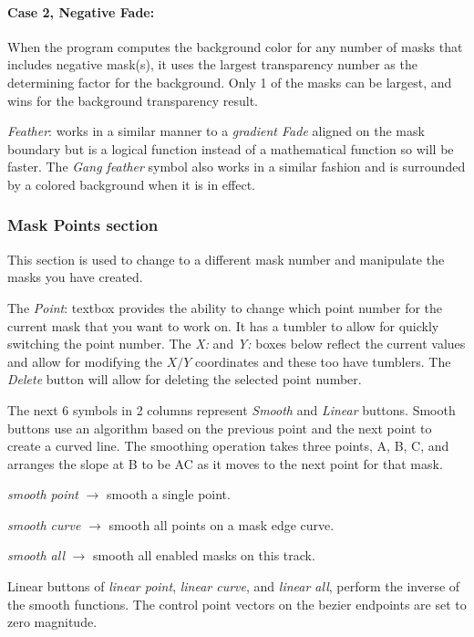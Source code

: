 \paragraph{Case 2, Negative Fade:} When the program computes the background color for any number of masks that includes negative
mask(s), it uses the largest transparency number as the determining factor for the background. Only 1 of the masks can be largest, and wins for the background transparency result.

\vspace{3ex}\textit{Feather}: works in a similar manner to a \textit{gradient Fade} aligned on the mask boundary but is a logical function instead of a mathematical function so will be faster.  The \textit{Gang feather} symbol also works in a similar fashion and is surrounded by a colored background when it is in effect.

\subsubsection*{Mask Points section}%
\label{ssub:masks_points_section}

This section is used to change to a different mask number and manipulate the masks you have created.

The \textit{Point}: textbox provides the ability to change which point number for the current mask that you want to work on.  It has a tumbler to allow for quickly switching the point number.  The \textit{X:} and \textit{Y:} boxes below reflect the current values and allow for modifying the $X/Y$ coordinates and these too have tumblers. The \textit{Delete} button will allow for deleting the selected point number.

The next 6 symbols in 2 columns represent \textit{Smooth} and \textit{Linear} buttons.  Smooth buttons use an algorithm based on the previous point and the next point to create a curved line. The smoothing operation takes three points, A, B, C, and arranges the slope at B to be AC as it moves to the next point for that mask.

\textit{smooth point}	$\rightarrow$ smooth a single point.

\textit{smooth curve}	$\rightarrow$ smooth all points on a mask edge curve.

\textit{smooth all} 	$\rightarrow$ smooth all enabled masks on this track.

Linear buttons of \textit{linear point}, \textit{linear curve}, and \textit{linear all}, perform the inverse of the smooth functions.
The control point vectors on the bezier endpoints are set to zero magnitude.

